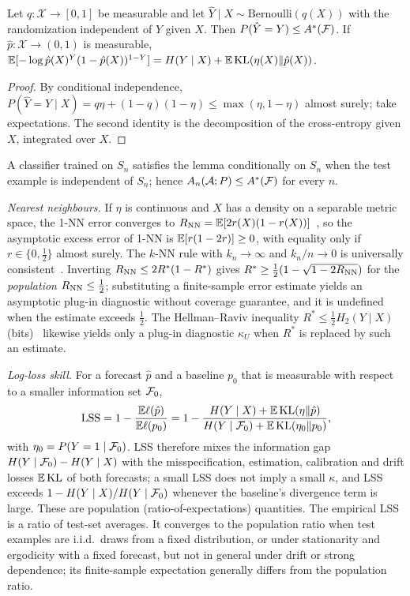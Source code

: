 \begin{lemma}[Ceiling]\label{lem:app1}
Let $q:\mathcal X\to[0,1]$ be measurable and let $\hat Y\mid X\sim\mathrm{Bernoulli}(q(X))$ with the randomization independent of $Y$ given $X$. Then $P(\hat Y=Y)\le A^*(\mathcal{F})$. If $\hat p:\mathcal X\to(0,1)$ is measurable, $\mathbb{E}[-\log\hat p(X)^{Y}(1-\hat p(X))^{1-Y}]=H(Y\mid X)+\mathbb{E}\,\mathrm{KL}(\eta(X)\Vert\hat p(X))$.
\end{lemma}
\begin{proof}
By conditional independence, $P(\hat Y=Y\mid X)=q\eta+(1-q)(1-\eta)\le\max(\eta,1-\eta)$ almost surely; take expectations. The second identity is the decomposition of the cross-entropy given $X$, integrated over $X$.
\end{proof}
A classifier trained on $S_n$ satisfies the lemma conditionally on $S_n$ when the test example is independent of $S_n$; hence $A_n(\mathcal A;P)\le A^*(\mathcal{F})$ for every $n$.

\emph{Nearest neighbours.} If $\eta$ is continuous and $X$ has a density on a separable metric space, the 1-NN error converges to $R_{\rm NN}=\mathbb{E}[2r(X)(1-r(X))]$~\cite{cover1967nearest}, so the asymptotic excess error of 1-NN is $\mathbb{E}[r(1-2r)]\ge0$, with equality only if $r\in\{0,\tfrac12\}$ almost surely. The $k$-NN rule with $k_n\to\infty$ and $k_n/n\to0$ is universally consistent~\cite{stone1977consistent}. Inverting $R_{\rm NN}\le2R^*(1-R^*)$ gives $R^*\ge\tfrac12(1-\sqrt{1-2R_{\rm NN}})$ for the \emph{population} $R_{\rm NN}\le\tfrac12$; substituting a finite-sample error estimate yields an asymptotic plug-in diagnostic without coverage guarantee, and it is undefined when the estimate exceeds $\tfrac12$. The Hellman--Raviv inequality $R^*\le\tfrac12H_2(Y\mid X)$ (bits)~\cite{hellman1970probability} likewise yields only a plug-in diagnostic $\kappa_U$ when $R^*$ is replaced by such an estimate.

\emph{Log-loss skill.} For a forecast $\hat p$ and a baseline $p_0$ that is measurable with respect to a smaller information set $\mathcal{F}_0$,
\begin{equation*}
\mathrm{LSS}=1-\frac{\mathbb{E}\ell(\hat p)}{\mathbb{E}\ell(p_0)}=1-\frac{H(Y\mid X)+\mathbb{E}\,\mathrm{KL}(\eta\Vert\hat p)}{H(Y\mid \mathcal{F}_0)+\mathbb{E}\,\mathrm{KL}(\eta_0\Vert p_0)},
\end{equation*}
with $\eta_0=P(Y=1\mid\mathcal{F}_0)$. LSS therefore mixes the information gap $H(Y\mid\mathcal{F}_0)-H(Y\mid X)$ with the misspecification, estimation, calibration and drift losses $\mathbb{E}\,\mathrm{KL}$ of both forecasts; a small LSS does not imply a small $\kappa$, and LSS exceeds $1-H(Y\mid X)/H(Y\mid\mathcal{F}_0)$ whenever the baseline's divergence term is large. These are population (ratio-of-expectations) quantities. The empirical LSS is a ratio of test-set averages. It converges to the population ratio when test examples are i.i.d.\ draws from a fixed distribution, or under stationarity and ergodicity with a fixed forecast, but not in general under drift or strong dependence; its finite-sample expectation generally differs from the population ratio.

